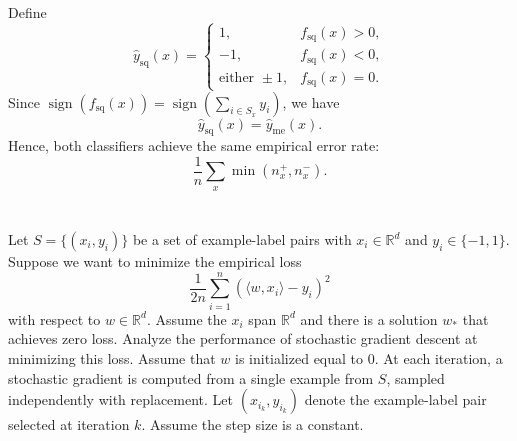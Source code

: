 \documentclass[a4paper]{article}
\begin{document}
\begin{enumerate}[(i)]
Define
\[
\hat{y}_{\mathrm{sq}}(x) =
\begin{cases}
1, & f_{\mathrm{sq}}(x) > 0,\\
-1, & f_{\mathrm{sq}}(x) < 0,\\
\text{either } \pm1, & f_{\mathrm{sq}}(x) = 0.
\end{cases}
\]
Since $\operatorname{sign}(f_{\mathrm{sq}}(x)) = \operatorname{sign}(\sum_{i \in S_x} y_i)$, we have
\[
\hat{y}_{\mathrm{sq}}(x) = \hat{y}_{\mathrm{me}}(x).
\]
Hence, both classifiers achieve the same empirical error rate:
\[
\boxed{
\frac{1}{n} \sum_{x} \min(n_x^+, n_x^-)
}.
\]

\end{enumerate}

\section{}
Let $S = \{(x_i , y_i )\}$ be a set of example-label pairs with $x_i \in \mathbb{R}^d$ and $y_i \in \{-1, 1\}$.
Suppose we want to minimize the empirical loss
$$\frac{1}{2n}\sum_{i=1}^n( \langle w, x_i\rangle - y_i)^2$$
with respect to $w \in \mathbb{R}^d$. 
Assume the $x_i$ span $\mathbb{R}^d$ and there is a solution $w_*$ that achieves zero loss.
Analyze the performance of stochastic gradient descent at minimizing this loss.
Assume that $w$ is initialized equal to 0.
At each iteration, a stochastic gradient is computed from a single example from $S$, sampled independently with replacement.
Let $(x_{i_k} , y_{i_k} )$ denote the example-label pair selected at iteration $k$.
Assume the step size is a constant.
\end{document}
